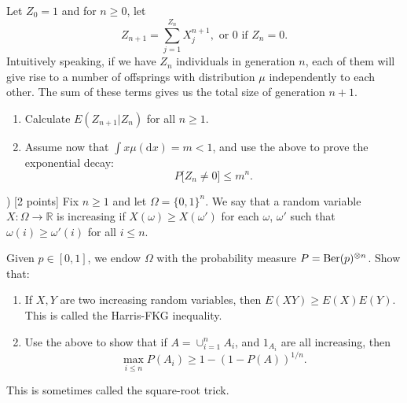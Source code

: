 \documentclass{article}
\newcommand*\1{\mathds{1}}
\def\d{\mathrm{d}}
\begin{document}
Let $Z_0 = 1$ and for $n \geq 0$, let
\begin{equation}
  Z_{n + 1} = \sum_{j=1}^{Z_n} X^{n+1}_j, \text{ or $0$ if $Z_n = 0$.}
\end{equation}
Intuitively speaking, if we have $Z_n$ individuals in generation $n$, each of them will give rise to a number of offsprings with distribution $\mu$ independently to each other.
The sum of these terms gives us the total size of generation $n + 1$.
\begin{enumerate}[\quad a)]
\item Calculate $E(Z_{n+1} | Z_n)$ for all $n \geq 1$.
\item Assume now that $\int x \mu(\d x) = m < 1$, and use the above to prove the exponential decay:
  \begin{equation}
    P\big[ Z_n \neq 0 \big] \leq m^{n}.
  \end{equation}
\end{enumerate}
\vspace{4mm}


) [2 points] Fix $n \geq 1$ and let $\Omega = \{0,1\}^n$.
We say that a random variable $X: \Omega \to \mathbb{R}$ is increasing if $X(\omega) \geq X(\omega')$ for each $\omega$, $\omega'$ such that $\omega(i) \geq \omega'(i)$ for all $i \leq n$.

Given $p \in [0,1]$, we endow $\Omega$ with the probability measure $P = \textnormal{Ber}(p)^{\otimes n}$.
Show that:
\begin{enumerate}
\item If $X, Y$ are two increasing random variables, then $E(XY) \geq E(X) E(Y)$.
This is called the Harris-FKG inequality.
\item Use the above to show that if $A = \cup_{i=1}^n A_i$, and $1_{A_i}$ are all increasing, then
  \begin{equation}
    \max_{i \leq n} P(A_i) \geq 1 - (1 - P(A))^{1/n}.
  \end{equation}
\end{enumerate}
This is sometimes called the square-root trick.
\end{document}
